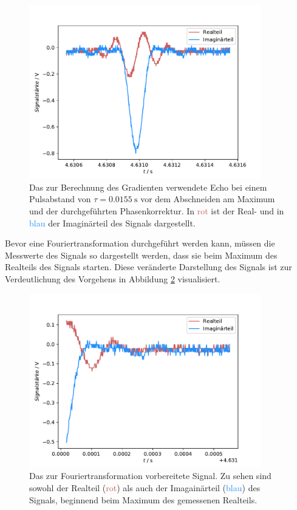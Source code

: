 \begin{figure}[H]
  \centering
  \includegraphics[width=0.9\textwidth]{../Auswertung/echo_vorher.pdf}
  \caption{Das zur Berechnung des Gradienten verwendete Echo bei einem Pulsabstand von $\tau = \SI{0.0155}{\second}$
  vor dem Abschneiden am Maximum und der durchgeführten
  Phasenkorrektur. In \textcolor{indianred}{rot} ist der Real- und in \textcolor{dodgerblue}{blau} der Imaginärteil des Signals dargestellt.}
  \label{fig:echo_vorher}
\end{figure} \noindent
Bevor eine Fouriertransformation durchgeführt werden kann, müssen die Messwerte des Signals so dargestellt werden, dass sie
beim Maximum des Realteils des Signals starten. Diese veränderte Darstellung des Signals ist zur Verdeutlichung des Vorgehens in
Abbildung \ref{fig:echo_ab} visualisiert.
\begin{figure}[H]
  \centering
  \includegraphics[width=0.9\textwidth]{../Auswertung/echo_abgeschnitten.pdf}
  \caption{Das zur Fouriertransformation vorbereitete Signal. Zu sehen sind sowohl der Realteil (\textcolor{indianred}{rot}) als auch der
  Imagainärteil (\textcolor{dodgerblue}{blau}) des Signals, beginnend beim Maximum des gemessenen Realteils.}
  \label{fig:echo_ab}
\end{figure} \noindent
